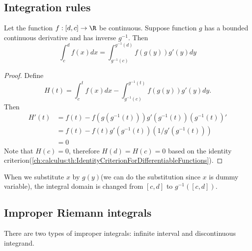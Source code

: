 \begin{refsection}
\subsection{Integration rules}
\begin{lemma}\cite[179]{fitzpatrick2006advanced}\label{ch:calculus:th:SingleVariableIntegralIntegrationBySubstitution}
Let the function $f:[d,c] \to \R$ be continuous. Suppose function $g$ has a bounded continuous derivative and has inverse $g^{-1}$. Then	
	$$\int_c^d f(x)dx = \int_{g^{-1}(c)}^{g^{-1}(d)} f(g(y)) g'(y) dy$$
\end{lemma}
\begin{proof}
Define $$H(t) = \int_c^t f(x)dx - \int_{g^{-1}(c)}^{g^{-1}(t)} f(g(y)) g'(y) dy.$$
Then
\begin{align*}
H'(t) &= f(t) - f(g(g^{-1}(t)))g'(g^{-1}(t))(g^{-1}(t))' \\
&= f(t) - f(t)g'(g^{-1}(t))(1/g'(g^{-1}(t))) \\
&= 0
\end{align*}
Note that $H(c) = 0$, therefore $H(d) = H(c) = 0$ based on the identity criterion(\autoref{ch:calculus:th:IdentityCriterionForDifferentiableFunctions}).
\end{proof}

\begin{remark}
When we substitute $x$ by $g(y)$(we can do the substitution since $x$ is dummy variable), the integral domain is changed from $[c,d]$ to $g^{-1}([c,d])$.	
\end{remark}

\subsection{Improper Riemann integrals}


\begin{remark}
	There are two types of improper integrals: infinite interval and discontinuous integrand.	
\end{remark}


\end{refsection}
